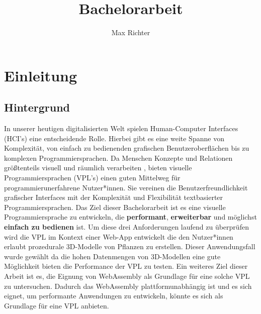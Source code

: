 \documentclass[ngerman]{article}
\title{Bachelorarbeit}
\author{Max Richter}
\begin{document}
\pagestyle{fancy}
\fancyhead{} %
\fancyfoot{} %
\fancyfoot[LE,RO]{\thepage}

\raggedright

\maketitle
\pagebreak

\tableofcontents

\pagebreak

\section{Einleitung}

\subsection{Hintergrund}
In unserer heutigen digitalisierten Welt spielen Human-Computer Interfaces (HCI's) eine entscheidende Rolle.
Hierbei gibt es eine weite Spanne von Komplexität, von einfach zu bedienenden grafischen Benutzeroberflächen bis zu komplexen Programmiersprachen. 
\linebreak
\linebreak
Da Menschen Konzepte und Relationen größtenteils visuell und räumlich verarbeiten \cite{smith1975pygmalion}, bieten visuelle Programmiersprachen (VPL's) einen guten Mittelweg für programmierunerfahrene Nutzer*innen. 
Sie vereinen die Benutzerfreundlichkeit grafischer Interfaces mit der Komplexität und Flexibilität textbasierter Programmiersprachen.
\linebreak
\linebreak
Das Ziel dieser Bachelorarbeit ist es eine visuelle Programmiersprache zu entwickeln, die \textbf{performant}, \textbf{erweiterbar} und möglichst \textbf{einfach zu bedienen} ist.
Um diese drei Anforderungen laufend zu überprüfen wird die VPL im Kontext einer Web-App entwickelt die den Nutzer*innen erlaubt prozedurale 3D-Modelle von Pflanzen zu erstellen.
Dieser Anwendungsfall wurde gewählt da die hohen Datenmengen von 3D-Modellen eine gute Möglichkeit bieten die Performance der VPL zu testen.
\linebreak
\linebreak
Ein weiteres Ziel dieser Arbeit ist es, die Eignung von WebAssembly als Grundlage für eine solche VPL zu untersuchen. 
Dadurch das WebAssembly plattformunabhängig ist und es sich eignet, um performante Anwendungen zu entwickeln, könnte es sich als Grundlage für eine VPL anbieten.
\end{document}
